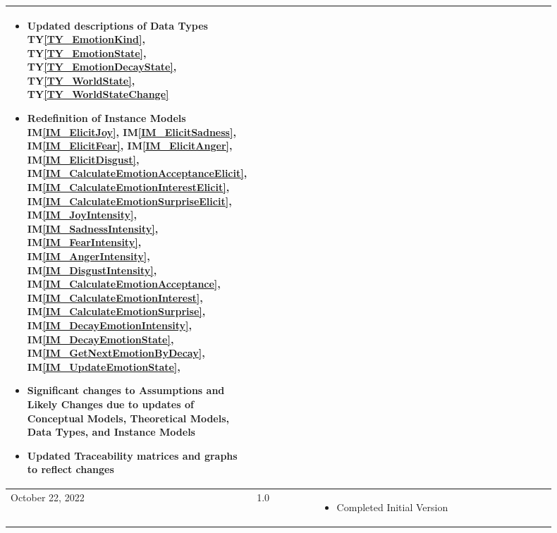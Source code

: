 \documentclass[11pt, titlepage]{article}
\makeatletter
\newcommand\newref[1]{#1\def\@currentlabel{#1}}
\newcommand{\iref}[1]{IM\ref{#1}}
\newcommand{\tyref}[1]{TY\ref{#1}}
\makeatother
\begin{document}
\begin{center}
\begin{tabular}{m{0.17\linewidth}C{0.15\linewidth}m{0.58\linewidth}}
\begin{itemize}[noitemsep, nosep]
                \item Updated descriptions of Data Types
                \tyref{TY_EmotionKind}, \tyref{TY_EmotionState},
                \tyref{TY_EmotionDecayState}, \tyref{TY_WorldState},
                \tyref{TY_WorldStateChange}

                \item Redefinition of Instance Models \iref{IM_ElicitJoy},
                \iref{IM_ElicitSadness}, \iref{IM_ElicitFear},
                \iref{IM_ElicitAnger}, \iref{IM_ElicitDisgust},
                \iref{IM_CalculateEmotionAcceptanceElicit},
                \iref{IM_CalculateEmotionInterestElicit},
                \iref{IM_CalculateEmotionSurpriseElicit},
                \iref{IM_JoyIntensity}, \iref{IM_SadnessIntensity},
                \iref{IM_FearIntensity}, \iref{IM_AngerIntensity},
                \iref{IM_DisgustIntensity},
                \iref{IM_CalculateEmotionAcceptance},
                \iref{IM_CalculateEmotionInterest},
                \iref{IM_CalculateEmotionSurprise},
                \iref{IM_DecayEmotionIntensity}, \iref{IM_DecayEmotionState},
                \iref{IM_GetNextEmotionByDecay}, \iref{IM_UpdateEmotionState},

                \item Significant changes to Assumptions and Likely Changes due
                to updates of Conceptual Models, Theoretical Models, Data
                Types, and Instance Models

                \item Updated Traceability matrices and graphs to reflect
                changes
            \end{itemize} \\

            \midrule

             \vspace*{1mm}October 22, 2022 & \vspace*{1mm}\newref{1.0} &
             \vspace*{5mm}
             \begin{itemize}[noitemsep, nosep]
                 \item Completed Initial Version
             \end{itemize} \\

             \midrule


\end{tabular}
\end{center}
\end{document}
